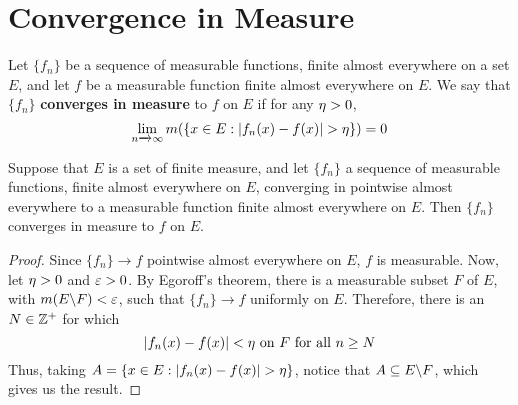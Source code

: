 \section{Convergence in Measure}

\begin{definition}
    Let $\{f_n\}$ be a sequence of measurable functions, finite almost
    everywhere on a set $E$, and let  $f$ be a measurable function finite almost
    everywhere on  $E$. We say that  $\{f_n\}$ \textbf{converges in measure} to
    $f$ on  $E$ if for any  $\eta>0$,
    \begin{equation*}
        \lim_{n \xrightarrow{} \infty}m(\{x \in E : |f_n(x)-f(x)|>\n\})=0
    \end{equation*}
\end{definition}

\begin{lemma}\label{10.6.1}
    Suppose that $E$ is a set of finite measure, and let  $\{f_n\}$ a sequence
    of measurable functions, finite almost everywhere on $E$, converging in
    pointwise almost everywhere to a measurable function finite almost everywhere
    on  $E$. Then  $\{f_n\}$ converges in measure to $f$ on  $E$.
\end{lemma}
\begin{proof}
    Since $\{f_n\} \xrightarrow{} f$ pointwise almost everywhere on $E$,  $f$ is
    measurable. Now, let  $\eta>0$ and  $\varepsilon>0$. By  Egoroff's theorem, there is a
    measurable subset $F$ of  $E$, with $m(E \backslash F)<\varepsilon$, such that $\{f_n\}
    \xrightarrow{} f$ uniformly on $E$. Therefore, there is an  $N \in \mathbb{Z}^+$ for
    which
    \begin{equation*}
        |f_n(x)-f(x)|<\eta \text{ on } F \text{ for all } n \geq N
    \end{equation*}
    Thus, taking $A=\{x \in E : |f_n(x)-f(x)|>\n\}$, notice that $A \subseteq
    E \backslash F$, which gives us the result.
\end{proof}


